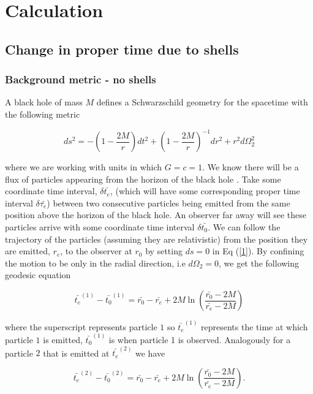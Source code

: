 \documentclass[aps,showpacs,onecolumn,floats,prd,superscriptaddress,nofootinbib]{revtex4}
\begin{document}
\section{Calculation}

\subsection{Change in proper time due to shells}

\subsubsection{Background metric - no shells}

A black hole of mass $M$ defines a Schwarzschild geometry for the spacetime with the following metric 

\begin{equation}
	ds^2 = - \left( 1 -\frac{2M}{r} \right) dt^2 + \left( 1 - \frac{2M}{r} \right)^{-1} dr^2 + r^2 d \Omega_2^2	\label{1}
\end{equation}

where we are working with units in which $G = c = 1$. We know there will be a flux of particles appearing from the horizon of the black hole \cite{Haw74}. Take some coordinate time interval, $\delta \bar{t_e}$, (which will have some corresponding proper time interval $\delta \bar{\tau_e}$) between two consecutive particles being emitted from the same position above the horizon of the black hole. An observer far away will see these particles arrive with some coordinate time interval $\delta \bar{t_0}$. We can follow the trajectory of the particles (assuming they are relativistic) from the position they are emitted, $r_e$, to the observer at $r_0$ by setting $ds = 0$ in Eq (\ref{1}). By confining the motion to be only in the radial direction, i.e $d \Omega_2 = 0$, we get the following geodesic equation

\begin{equation}
	\bar{t_e}^{(1)} - \bar{t_0}^{(1)} = \bar{r_0} - \bar{r_e} + 2M \ln \left( \frac{\bar{r_0} - 2M}{\bar{r_e} - 2M}  \right)	\label{3}
\end{equation}

where the superscript represents particle $1$ so $\bar{t_e}^{(1)}$ represents the time at which particle $1$ is emitted, $\bar{t_0}^{(1)}$ is when particle 1 is observed. Analogously for a particle $2$ that is emitted at $\bar{t_e}^{(2)}$ we have

\begin{equation}
	\bar{t_e}^{(2)} - \bar{t_0}^{(2)} = \bar{r_0} - \bar{r_e} + 2M \ln \left( \frac{\bar{r_0} - 2M}{\bar{r_e} - 2M}  \right).	\label{4}
\end{equation}
\end{document}
